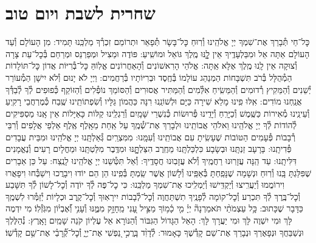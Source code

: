 \documentclass[twoside, openany, parskip=half, 11pt]{book}
\begin{document}
\chapter[שחרית לשבת ויום טוב]{ שחרית לשבת ויום טוב }




\label{nishmas}
כׇּל־חַי תְּ֯בָרֵךְ אֶת־שִׁמְךָ יְיָ אֱלֹהֵֽינוּ וְ֯רֽוּחַ כׇּל־בָּשָׂר תְּ֯פָאֵר וּתְרוֹמֵם זִכְרְ֯ךָ מַלְכֵּֽנוּ תָּמִיד: מִן הָעוֹלָם וְ֯עַד הָעוֹלָם אַתָּה אֵל וּמִבַּלְעָדֶֽיךָ אֵין לׇׇׇֽנּוּ מֶֽלֶךְ גּוֹאֵל וּמוֹשִֽׁיעַ:
פּוֹדֶה וּמַצִיל וּמְפַרְנֵס וּמְרַחֵם בְּ֯כׇל־עֵת צָרָה וְ֯צוּקָה אֵין לָֽנוּ מֶֽלֶךְ אֶלָּא אַֽתָּה: אֱלֹהֵי הָרִאשׁוֹנִים וְ֯הָאַחֲרוֹנִים אֱלֽוֹהַּ כׇּל־בְּ֯רִיּוֹת אֲדוֹן כׇּל־תּוֹלָדוֹת הַמְ֯הֻלָּל בְּ֯רֹב תִּשְׁבָּחוֹת הַמְנַהֵג עוֹלָמוֹ בְּ֯חֶֽסֶד וּבְרִיּוֹתָיו בְּ֯רַחֲמִים: וַיְיָ לֹא יָנוּם וְ֯לֹא יִישָׁן הַמְ֯עוֹרֵר יְ֯שֵׁנִים וְ֯הַמֵּקִיץ רְ֯דוּמִים וְ֯הַמֵּשִֽׂיחַ אִלְּ֯מִים וְ֯הַמַּתִּיר אֲסוּרִים וְ֯הַסּוֹמֵךְ נוֹפְ֯לִים וְ֯הַזּוֹקֵף כְּ֯פוּפִים לְ֯ךָ לְ֯בַדְּ֯ךָ אֲנַֽחְנוּ מוֹדִים: אִֽלּוּ פִֽינוּ מָלֵא שִׁירָה כַּיָּם וּלְשׁוֹנֵֽנוּ רִנָּה כַּהֲמוֹן גַּלָּיו וְ֯שִׂפְתוֹתֵֽינוּ שֶֽׁבַח כְּ֯מֶרְחֲבֵי רָקִֽיעַ וְ֯עֵינֵֽינוּ מְ֯אִירוֹת כַּשֶּֽׁמֶשׁ וְ֯כַיָּרֵֽחַ וְ֯יָדֵֽינוּ פְּ֯רוּשׂוֹת כְּ֯נִשְׁרֵי שָּׁמָֽיִם וְ֯רַגְלֵֽינוּ קַלּוֹת כָּאַיָּלוֹת אֵין אָֽנוּ מַסְפִּיקִים לְ֯הוֹדוֹת לְ֯ךָ יְיָ אֱלֹהֵֽינוּ וֵאלֹהֵי אֲבוֹתֵֽינוּ וּלְבָרֵךְ אֶת־שְׁ֯מֶֽךָ עַל אַֽחַת מֵאָֽלֶף אֶֽלֶף אַלְפֵי אֲלָפִים וְ֯רִבֵּי רְ֯בָבוֹת פְּ֯עָמִים הַטּוֹבוֹת שֶׁעָשִֽׂיתָ עִם אֲבוֹתֵֽינוּ וְ֯עִמָּֽנוּ: מִמִּצְרַֽיִם גְּ֯אַלְתָּֽנוּ יְיָ אֱלֹהֵֽינוּ וּמִבֵּית עֲבָדִים פְּ֯דִיתָֽנוּ: בָּרָעָב זַנְתָּֽנוּ וּבְשָׂבָע כִּלְכַּלְתָּֽנוּ מֵחֶֽרֶב הִצַּלְתׇׇׇּֽנּוּ וּמִדֶּֽבֶר מִלַּטְתָּֽנוּ וּמֵחֳלָיִם רָעִים וְ֯נֶאֱמָנִים דִּלִּיתָֽנוּ: עַד הֵֽנָּה עֲזָרֽוּנוּ רַחֲמֶֽיךָ וְ֯לֹא עֲזָבֽוּנוּ חֲסָדֶֽיךָ: וְ֯אַל תִּטְּ֯שֵׁנוּ יְיָ אֱלֹהֵֽינוּ לָנֶֽצַח: עַל כֵּן אֵבָרִים שֶׁפִּלַּגְתָּ בָּֽנוּ וְ֯רֽוּחַ וּנְשָׁמָה שֶׁנָּפַֽחְתָּ בְּ֯אַפֵּֽינוּ וְ֯לָשׁוֹן אֲשֶׁר שַֽׂמְתָּ בְּ֯פִֽינוּ הֵן הֵם יוֹדוּ וִיבָרֲכוּ וִישַׁבְּ֯חוּ וִיפָאֲרוּ וִירוֹמֲמוּ וְ֯יַעֲרִֽיצוּ וְ֯יַקְדִּֽישׁוּ וְ֯יַמְלִֽיכוּ אֶת־שִׁמְךָ מַלְכֵּֽנוּ: כִּי כׇל־פֶּה לְ֯ךָ יוֹדֶה וְ֯כׇל־לָשׁוֹן לְ֯ךָ תִּשָּׁבַע וְ֯כׇל־בֶּֽרֶךְ לְ֯ךָ תִּכְרַע וְ֯כׇל־קוֹמָה לְ֯פָנֶֽיךָ תִשְׁתַּחֲוֶה וְ֯כׇל־לְ֯בָבוֹת יִירָאֽוּךָ וְ֯כׇל־קֶֽרֶב וּכְלָיוֹת יְ֯זַמְּ֯רוּ לִשְׁמֶֽךָ כַּדָּבָר שֶׁכָּתוּב:
כָּ֥ל עַצְמֹתַ֨י תֹּאמַרְנָה֘ יְיָ֗ מִ֤י כָ֫מ֥וֹךָ מַצִּ֣יל עָ֭נִי מֵֽחָזָ֣ק מִמֶּ֑נּוּ וְ֯עָנִ֥י וְ֝֯אֶבְי֗וֹן מִגֹּֽזְ֯לֽוֹ׃ מִי יִדְמֶה לָּךְ וּמִי יִשְׁוֶה לָּךְ וּמִי יַעֲרָךְ לָּךְ: הָאֵל הַגָּדוֹל הַגִּבּוֹר וְ֯הַנּוֹרָא אֵל עֶלְיוֹן קֹנֵה שָׁמַֽיִם וָאָֽרֶץ:
נְ֯הַלֶּלְךָ וּנְשַׁבֵּחֲךָ וּנְפָאֶרְךָ וּנְבָרֵךְ אֶת־שֵׁם קָדְ֯שֶׁךָ כָּאָמוּר:
לְ֯דָוִ֨ד בָּֽרֲכִ֣י נַ֭פְשִׁי אֶת־יְיָ֑ וְ֯כׇל־קְ֝֯רָבַ֗י אֶת־שֵׁ֥ם קָדְ֯שֽׁוֹ׃
\end{document}
